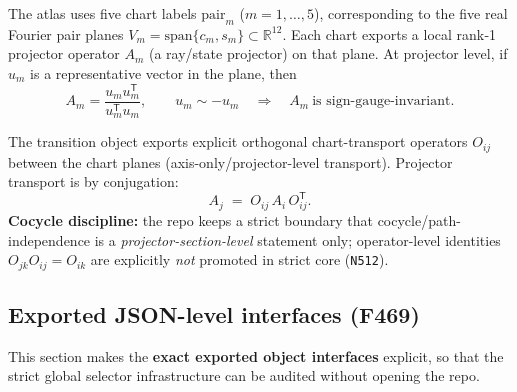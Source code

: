 \documentclass[11pt,a4paper]{article}
\begin{document}
The atlas uses five chart labels $\mathrm{pair}_m$ ($m=1,\dots,5$), corresponding to the five real Fourier pair planes
$V_m=\mathrm{span}\{c_m,s_m\}\subset \mathbb{R}^{12}$.
Each chart exports a local rank‑1 projector operator $A_m$ (a ray/state projector) on that plane.
At projector level, if $u_m$ is a representative vector in the plane, then
\[
A_m=\frac{u_m u_m^{\mathsf T}}{u_m^{\mathsf T}u_m},
\qquad
u_m\sim -u_m\quad\Rightarrow\quad A_m\ \text{is sign-gauge-invariant.}
\]

The transition object exports explicit orthogonal chart-transport operators $O_{ij}$ between the chart planes (axis-only/projector-level transport).
Projector transport is by conjugation:
\[
A_j \;=\; O_{ij}\,A_i\,O_{ij}^{\mathsf T}.
\]
\textbf{Cocycle discipline:} the repo keeps a strict boundary that cocycle/path-independence is a \emph{projector-section-level} statement only;
operator-level identities $O_{jk}O_{ij}=O_{ik}$ are explicitly \emph{not} promoted in strict core (\texttt{N512}).

\subsection{Exported JSON-level interfaces (F469)}
\label{sec:f469_interfaces}

This section makes the \textbf{exact exported object interfaces} explicit, so that the strict global selector infrastructure can be audited without opening the repo.
\end{document}
